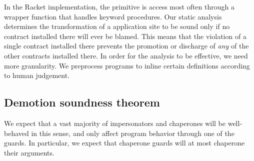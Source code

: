 \documentclass{sigplanconf}
\begin{document}


In the Racket implementation, the  primitive is access most often through a wrapper function that handles keyword procedures.
Our static analysis determines the transformation of a  application site to be sound only if no contract installed there will ever be blamed.
This means that the violation of a single contract installed there prevents the promotion or discharge of \emph{any} of the other contracts installed there.
In order for the analysis to be effective, we need more granularity.
We preprocess programs to inline certain definitions according to human judgement.

\subsection{Demotion soundness theorem}





We expect that a vast majority of impersonators and chaperones will be well-behaved in this sense, and only affect program behavior through one of the guards.
In particular, we expect that chaperone guards will at most chaperone their arguments.
\end{document}
